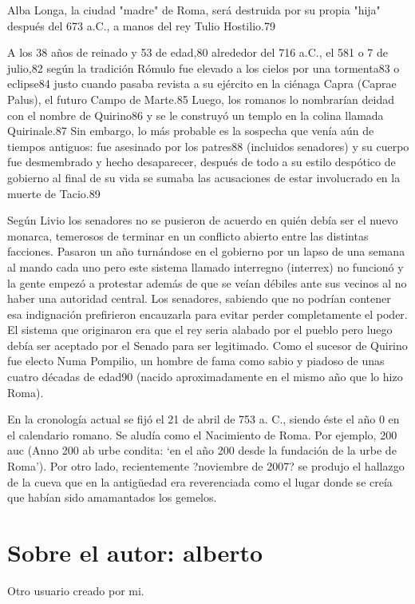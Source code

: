 \documentclass[11pt,a4paper]{book}
\begin{document}
	\bigskip
							Alba Longa, la ciudad "madre" de Roma, será destruida por su propia "hija" después del 673 a.C., a manos del rey Tulio Hostilio.79
	\bigskip
							
	\bigskip
							A los 38 años de reinado y 53 de edad,80 alrededor del 716 a.C., el 581 o 7 de julio,82 según la tradición Rómulo fue elevado a los cielos por una tormenta83 o eclipse84 justo cuando pasaba revista a su ejército en la ciénaga Capra (Caprae Palus), el futuro Campo de Marte.85 Luego, los romanos lo nombrarían deidad con el nombre de Quirino86 y se le construyó un templo en la colina llamada Quirinale.87 Sin embargo, lo más probable es la sospecha que venía aún de tiempos antiguos: fue asesinado por los patres88 (incluidos senadores) y su cuerpo fue desmembrado y hecho desaparecer, después de todo a su estilo despótico de gobierno al final de su vida se sumaba las acusaciones de estar involucrado en la muerte de Tacio.89
	\bigskip
							
	\bigskip
							Según Livio los senadores no se pusieron de acuerdo en quién debía ser el nuevo monarca, temerosos de terminar en un conflicto abierto entre las distintas facciones. Pasaron un año turnándose en el gobierno por un lapso de una semana al mando cada uno pero este sistema llamado interregno (interrex) no funcionó y la gente empezó a protestar además de que se veían débiles ante sus vecinos al no haber una autoridad central. Los senadores, sabiendo que no podrían contener esa indignación prefirieron encauzarla para evitar perder completamente el poder. El sistema que originaron era que el rey seria alabado por el pueblo pero luego debía ser aceptado por el Senado para ser legitimado. Como el sucesor de Quirino fue electo Numa Pompilio, un hombre de fama como sabio y piadoso de unas cuatro décadas de edad90 (nacido aproximadamente en el mismo año que lo hizo Roma).
	\bigskip
							
	\bigskip
							En la cronología actual se fijó el 21 de abril de 753 a. C., siendo éste el año 0 en el calendario romano. Se aludía como el Nacimiento de Roma. Por ejemplo, 200 auc (Anno 200 ab urbe condita: ‘en el año 200 desde la fundación de la urbe de Roma’). Por otro lado, recientemente ?noviembre de 2007? se produjo el hallazgo de la cueva que en la antigüedad era reverenciada como el lugar donde se creía que habían sido amamantados los gemelos.
	\bigskip
			
			\chapter{Sobre el autor: alberto}
												Otro usuario creado por mi.
	\bigskip
												
	\bigskip
			
\end{document}
